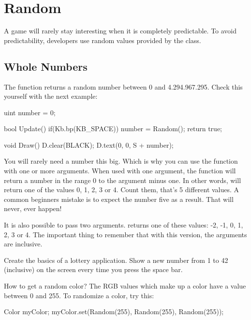\chapter{Random}
A game will rarely stay interesting when it is completely predictable. To avoid predictability, developers use random values provided by the  class.

\section{Whole Numbers}
The function  returns a random number between 0 and 4.294.967.295. Check this yourself with the next example:

\begin{code}
uint number = 0;

bool Update() {
  if(Kb.bp(KB_SPACE)) number = Random();
	return true;
}

void Draw() {
	D.clear(BLACK);
	D.text(0, 0, S + number);
}
\end{code}

You will rarely need a number this big. Which is why you can use the  function with one or more arguments. When used with one argument, the function will return a number in the range 0 to the argument minus one. In other words,   will return one of the values 0, 1, 2, 3 or 4. Count them, that's 5 different values. A common beginners mistake is to expect the number five as a result. That will never, ever happen!

It is also possible to pass two arguments.  returns one of these values: -2, -1, 0, 1, 2, 3 or 4. The important thing to remember that with this version, the arguments are inclusive.

\begin{exercise}
Create the basics of a lottery application. Show a new number from 1 to 42 (inclusive) on the screen every time you press the space bar. 
\end{exercise}

\begin{note}
How to get a random color? The RGB values which make up a color have a value between 0 and 255. To randomize a color, try this:

\begin{code}
Color myColor;
myColor.set(Random(255), Random(255), Random(255));
\end{code}
\end{note}

